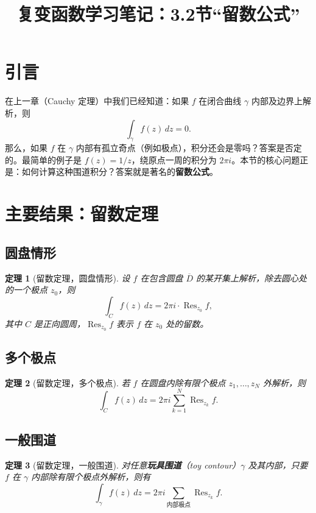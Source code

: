 \documentclass[UTF8]{ctexart}
\title{复变函数学习笔记：3.2节“留数公式”}
\date{}
\newtheorem{theorem}{定理}[section]
\numberwithin{equation}{section}
\begin{document}
\maketitle

\section{引言}

在上一章（Cauchy 定理）中我们已经知道：如果 \(f\) 在闭合曲线 \(\gamma\) 内部及边界上解析，则
\[
\int_{\gamma} f(z)\,dz = 0.
\]
那么，如果 \(f\) 在 \(\gamma\) 内部有孤立奇点（例如极点），积分还会是零吗？答案是否定的。最简单的例子是 \(f(z)=1/z\)，绕原点一周的积分为 \(2\pi i\)。本节的核心问题正是：如何计算这种围道积分？答案就是著名的\textbf{留数公式}。

\section{主要结果：留数定理}

\subsection{圆盘情形}
\begin{theorem}[留数定理，圆盘情形]
设 \(f\) 在包含圆盘 \(\overline{D}\) 的某开集上解析，除去圆心处的一个极点 \(z_0\)，则
\[
\int_{C} f(z)\,dz = 2\pi i \cdot \operatorname{Res}_{z_0}f,
\]
其中 \(C\) 是正向圆周，\(\operatorname{Res}_{z_0}f\) 表示 \(f\) 在 \(z_0\) 处的留数。
\end{theorem}

\subsection{多个极点}
\begin{theorem}[留数定理，多个极点]
若 \(f\) 在圆盘内除有限个极点 \(z_1,\dots,z_N\) 外解析，则
\[
\int_{C} f(z)\,dz = 2\pi i \sum_{k=1}^{N} \operatorname{Res}_{z_k}f.
\]
\end{theorem}

\subsection{一般围道}
\begin{theorem}[留数定理，一般围道]
对任意\textbf{玩具围道}（toy contour）\(\gamma\) 及其内部，只要 \(f\) 在 \(\gamma\) 内部除有限个极点外解析，则有
\[
\int_{\gamma} f(z)\,dz = 2\pi i \sum_{\text{内部极点}} \operatorname{Res}_{z_k}f.
\]
\end{theorem}
\end{document}
